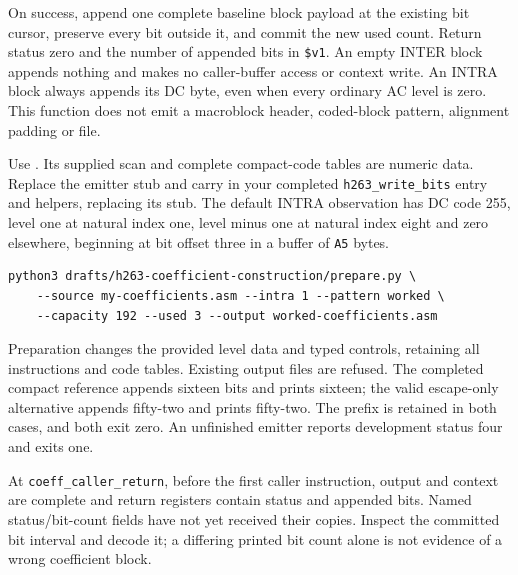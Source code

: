 On success, append one complete baseline block payload at the existing bit cursor,
preserve every bit outside it, and commit the new used count. Return status zero
and the number of appended bits in \texttt{\$v1}. An empty INTER block appends
nothing and makes no caller-buffer access or context write. An INTRA block always
appends its DC byte, even when every ordinary AC level is zero. This function
does not emit a macroblock header, coded-block pattern, alignment padding or file.

Use . Its supplied scan and
complete compact-code tables are numeric data. Replace the emitter stub and carry
in your completed \texttt{h263\_write\_bits} entry and helpers, replacing its stub.
The default INTRA observation has DC code 255, level one at natural index one,
level minus one at natural index eight and zero elsewhere, beginning at bit offset
three in a buffer of \texttt{A5} bytes.
\begin{verbatim}
python3 drafts/h263-coefficient-construction/prepare.py \
    --source my-coefficients.asm --intra 1 --pattern worked \
    --capacity 192 --used 3 --output worked-coefficients.asm
\end{verbatim}
Preparation changes the provided level data and typed controls, retaining all
instructions and code tables. Existing output files are refused. The completed
compact reference appends sixteen bits and prints sixteen; the valid escape-only
alternative appends fifty-two and prints fifty-two. The prefix is retained in
both cases, and both exit zero. An unfinished emitter reports development status
four and exits one.

At \texttt{coeff\_caller\_return}, before the first caller instruction, output
and context are complete and return registers contain status and appended bits.
Named status/bit-count fields have not yet received their copies. Inspect the
committed bit interval and decode it; a differing printed bit count alone is
not evidence of a wrong coefficient block.

